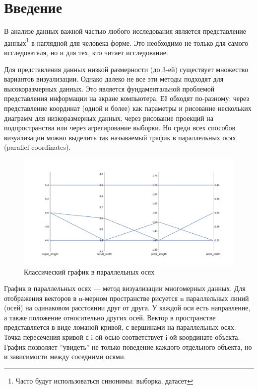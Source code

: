\documentclass[12pt,fleqn]{article}
\begin{document}
\newpage

\tableofcontents

\newpage

\section{Введение}
В анализе данных важной частью любого исследования является представление данных\footnote{
Часто будут использоваться синонимы: выборка, датасет}
в наглядной для человека форме. 
Это необходимо не только для самого исследователя, но и для тех, кто читает исследование.

Для представления данных низкой размерности (до 3-ей) существует множество
вариантов визуализации. Однако далеко не все эти методы подходят для
высокоразмерных данных. Это является фундаментальной проблемой
представления информации на экране компьютера.
Её обходят по-разному: через представление координат (одной и более) как параметры и рисование нескольких
диаграмм для низкоразмерных данных, через рисование проекций на подпространства или через агрегирование
выборки. Но среди всех способов визуализации можно выделить так называемый график в
параллельных осях (parallel coordinates).

\begin{figure}[htb]
    \centering
    \includegraphics[width=15cm]{classic_pc.pdf}
    \caption{Классический график в параллельных осях}
    \label{classic_pc}
\end{figure}

График в параллельных осях --- метод визуализации многомерных данных.
Для отображения векторов в n-мерном пространстве рисуется n параллельных линий (осей) на одинаковом
расстоянии друг от друга. У каждой оси есть направление, а также положение относительно других осей. 
Вектор в пространстве представляется в виде ломаной кривой, с вершинами на параллельных осях. Точка пересечения
кривой с i-ой осью соответствует i-ой координате объекта. График позволяет ''увидеть'' не только поведение каждого
отдельного объекта, но и зависимости между соседними осями.\cite{inselberg_1985}
\end{document}
